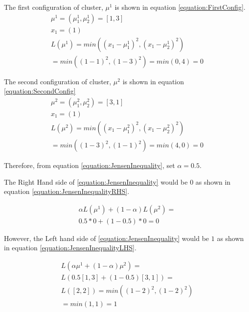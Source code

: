 \documentclass[a4paper,12pt]{article}
\begin{document}
The first configuration of cluster, $\mu^{1}$ is shown in equation \ref{equation:FirstConfig}.
\begin{equation}
\label{equation:FirstConfig}
\begin{split}
\mu^{1} = (\mu^{1}_{1}, \mu^{1}_{2}) = [1, 3] \\
x_{1} = (1) \\
L(\mu^{1}) = min((x_{1} - \mu^{1}_{1})^{2}, (x_{1} - \mu^{1}_{2})^{2}) \\ 
= min((1 - 1)^{2}, (1 - 3)^{2}) = min(0, 4) = 0
\end{split}
\end{equation}

The second configuration of cluster,  $\mu^{2}$ is shown in equation  \ref{equation:SecondConfig}
\begin{equation}
\label{equation:SecondConfig}
\begin{split}
\mu^{2} = (\mu^{2}_{1}, \mu^{2}_{2}) = [3, 1] \\
x_{1} = (1) \\
L(\mu^{2}) = min((x_{1} - \mu^{2}_{1})^{2}, (x_{1} - \mu^{2}_{2})^{2}) \\ 
= min((1 - 3)^{2}, (1 - 1)^{2}) = min(4, 0) = 0
\end{split}
\end{equation}

Therefore, from equation \ref{equation:JensenInequality}, set $\alpha = 0.5$. 

The Right Hand side of \ref{equation:JensenInequality} would be $0$ as shown in equation \ref{equation:JensenInequalityRHS}. 

\begin{equation}
\begin{split}
\label{equation:JensenInequalityRHS}
\alpha L(\mu^{1}) + (1-\alpha)L(\mu^{2}) = \\
0.5 * 0  + (1 - 0.5) * 0 = 0
\end{split}
\end{equation}

However, the Left hand side of \ref{equation:JensenInequality} would be $1$ as shown in equation \ref{equation:JensenInequalityLHS}. 

\begin{equation}
\begin{split}
\label{equation:JensenInequalityLHS}
L(\alpha \mu^{1} + (1-\alpha)\mu^{2}) = \\
L(0.5[1, 3] + (1-0.5)[3, 1]) = \\
L([2, 2]) = min((1 - 2)^{2}, (1 - 2)^{2}) \\
= min(1, 1) = 1 
\end{split}
\end{equation}
\end{document}
